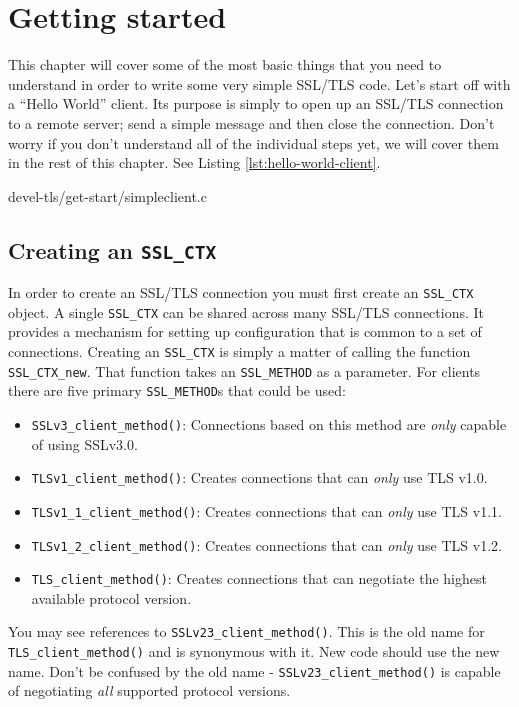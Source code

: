 \chapter{Getting started}
\label{chp:getting-started}

This chapter will cover some of the most basic things that you need to 
understand in order to write some very simple SSL/TLS code. Let's start off with
a ``Hello World'' client. Its purpose is simply to open up an SSL/TLS
connection to a remote server; send a simple message and then close the
connection. Don't worry if you don't understand all of the individual steps yet,
we will cover them in the rest of this chapter. See Listing
\ref{lst:hello-world-client}.


{devel-tls/get-start/simpleclient.c}

\section{Creating an \texttt{SSL\_CTX}}

In order to create an SSL/TLS connection you must first create an
\verb!SSL_CTX! object. A single \verb!SSL_CTX! can be shared across
many SSL/TLS connections. It provides a mechanism for setting up configuration
that is common to a set of connections. Creating an \verb!SSL_CTX! is 
simply a matter of calling the function \verb!SSL_CTX_new!. That function 
takes an \verb!SSL_METHOD! as a parameter. For clients there are five 
primary \verb!SSL_METHOD!s that could be used:
\begin{itemize}
\item \verb!SSLv3_client_method()!: Connections based on this method are 
\emph{only} capable of using SSLv3.0.
\item \verb!TLSv1_client_method()!: Creates connections that can 
\emph{only} use TLS v1.0.
\item \verb!TLSv1_1_client_method()!: Creates connections that can 
\emph{only} use TLS v1.1.
\item \verb!TLSv1_2_client_method()!: Creates connections that can 
\emph{only} use TLS v1.2.
\item \verb!TLS_client_method()!: Creates connections that can negotiate 
the highest available protocol version.
\end{itemize}

You may see references to \verb!SSLv23_client_method()!. This is the old 
name for \verb!TLS_client_method()! and is synonymous with it. New code 
should use the new name. Don't be confused by the old name - 
\verb!SSLv23_client_method()! is capable of negotiating \emph{all} 
supported protocol versions.


